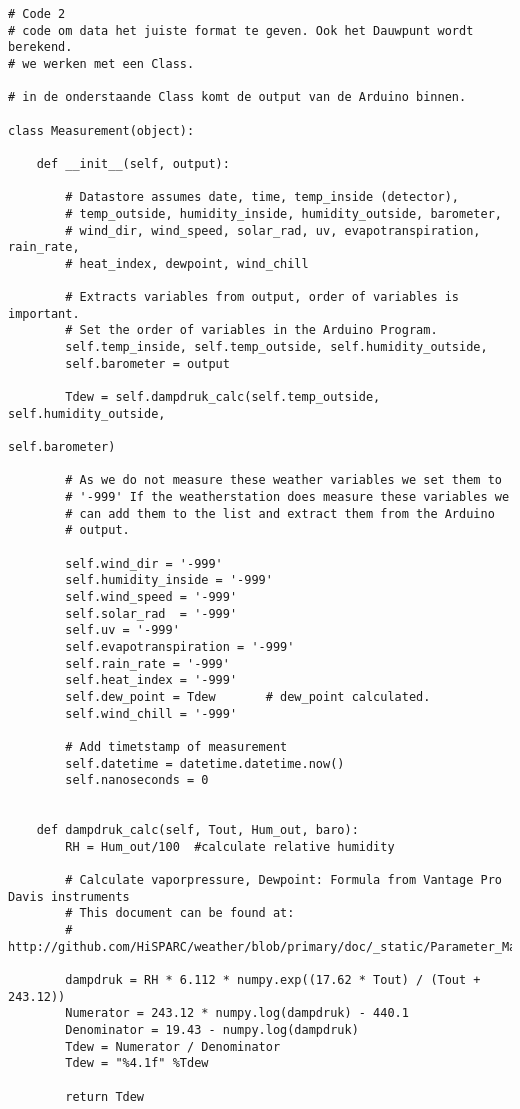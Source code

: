 \begin{verbatim}
# Code 2
# code om data het juiste format te geven. Ook het Dauwpunt wordt berekend.
# we werken met een Class.

# in de onderstaande Class komt de output van de Arduino binnen.

class Measurement(object):

    def __init__(self, output):

        # Datastore assumes date, time, temp_inside (detector),
        # temp_outside, humidity_inside, humidity_outside, barometer,
        # wind_dir, wind_speed, solar_rad, uv, evapotranspiration, rain_rate,
        # heat_index, dewpoint, wind_chill

        # Extracts variables from output, order of variables is important.
        # Set the order of variables in the Arduino Program.
        self.temp_inside, self.temp_outside, self.humidity_outside,
        self.barometer = output

        Tdew = self.dampdruk_calc(self.temp_outside, self.humidity_outside,
                                                            self.barometer)

        # As we do not measure these weather variables we set them to
        # '-999' If the weatherstation does measure these variables we
        # can add them to the list and extract them from the Arduino
        # output.

        self.wind_dir = '-999'
        self.humidity_inside = '-999'
        self.wind_speed = '-999'
        self.solar_rad  = '-999'
        self.uv = '-999'
        self.evapotranspiration = '-999'
        self.rain_rate = '-999'
        self.heat_index = '-999'
        self.dew_point = Tdew       # dew_point calculated.
        self.wind_chill = '-999'

        # Add timetstamp of measurement
        self.datetime = datetime.datetime.now()
        self.nanoseconds = 0


    def dampdruk_calc(self, Tout, Hum_out, baro):
        RH = Hum_out/100  #calculate relative humidity

        # Calculate vaporpressure, Dewpoint: Formula from Vantage Pro Davis instruments
        # This document can be found at:
        # http://github.com/HiSPARC/weather/blob/primary/doc/_static/Parameter_Manual.pdf

        dampdruk = RH * 6.112 * numpy.exp((17.62 * Tout) / (Tout + 243.12))
        Numerator = 243.12 * numpy.log(dampdruk) - 440.1
        Denominator = 19.43 - numpy.log(dampdruk)
        Tdew = Numerator / Denominator
        Tdew = "%4.1f" %Tdew

        return Tdew
\end{verbatim}

